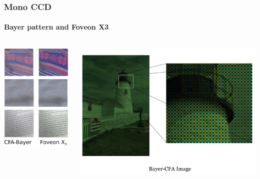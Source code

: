 \documentclass{beamer}
\begin{document}
\begin{frame}
\frametitle{Mono CCD}
\framesubtitle{Bayer pattern and Foveon X3}
\begin{columns}
\begin{center}
\includegraphics[scale=0.3]{images/L7_ex_FoevonBayer.png}
\end{center}
\begin{center}
\includegraphics[scale=0.26]{images/L7_ex_BayerCFA}
\end{center}
\end{columns}
\end{frame}
\end{document}
